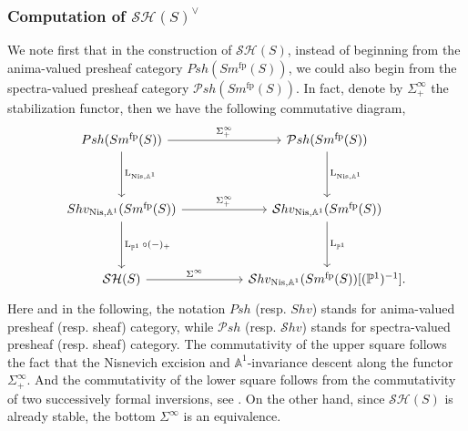 \documentclass{article}
\theoremstyle{definition}
\newcommand{\on}{\operatorname}
\begin{document}
\subsubsection{Computation of $\mathcal{SH}(S)^{\vee}$}
We note first that in the construction of $\mathcal{SH}(S)$, instead of beginning from the anima-valued presheaf category $Psh(Sm^{\on{fp}}(S))$, we could also begin from the spectra-valued presheaf category $\mathcal{P}sh(Sm^{\on{fp}}(S))$. In fact, denote by $\Sigma^\infty_+$ the stabilization functor, then we have the following commutative diagram,
\[\begin{tikzcd}
	{Psh(Sm^{\on{fp}}(S))} && {\mathcal{P}sh(Sm^{\on{fp}}(S))} \\
	\\
	{Shv_{\on{Nis},\mathbb{A}^1}(Sm^{\on{fp}}(S))} && {\mathcal{S}hv_{\on{Nis},\mathbb{A}^1}(Sm^{\on{fp}}(S))} \\
	\\
	{\mathcal{SH}(S)} && {\mathcal{S}hv_{\on{Nis},\mathbb{A}^1}(Sm^{\on{fp}}(S))[(\mathbb{P}^1)^{-1}]}
	\arrow["{{\Sigma^\infty_+}}", from=1-1, to=1-3]
	\arrow["{{\on{L}_{\on{Nis},\mathbb{A}^1}}}", from=1-1, to=3-1]
	\arrow["{{\on{L}_{\on{Nis},\mathbb{A}^1}}}", from=1-3, to=3-3]
	\arrow["{{\Sigma^\infty_+}}", from=3-1, to=3-3]
	\arrow["{{\on{L}_{\mathbb{P}^1}\circ (-)_+}}", from=3-1, to=5-1]
	\arrow["{{\on{L}_{\mathbb{P}^1}}}", from=3-3, to=5-3]
	\arrow["{{\Sigma^\infty}}", from=5-1, to=5-3].
\end{tikzcd}\]
Here and in the following, the notation $Psh$ (resp. $Shv$) stands for anima-valued presheaf (resp. sheaf) category, while $\mathcal{P}sh$ (resp. $\mathcal{S}hv$) stands for spectra-valued presheaf (resp. sheaf) category. The commutativity of the upper square follows the fact that the Nisnevich excision and $\mathbb{A}^1$-invariance descent along the functor $\Sigma^\infty_+$. And the commutativity of the lower square follows from
the commutativity of two successively formal inversions, see \cite[Remark 4.11]{Rob}. On the other hand, since $\mathcal{SH}(S)$ is already stable, the bottom $\Sigma^\infty$ is an equivalence.
\end{document}
